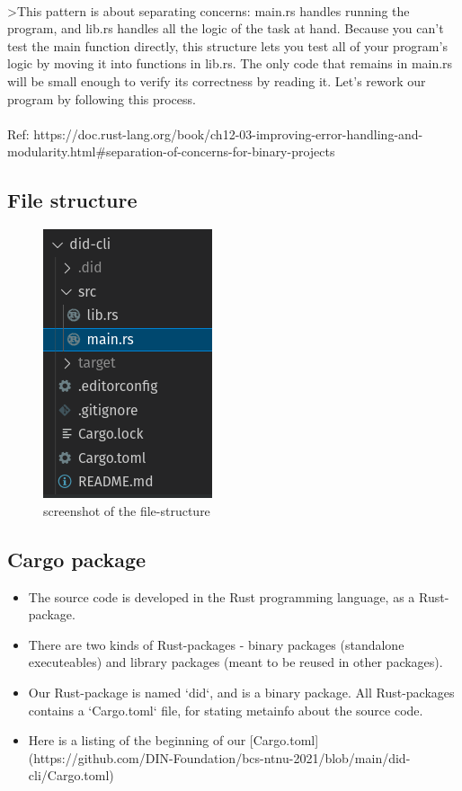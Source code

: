 \paragraph{}
>This pattern is about separating concerns: main.rs handles running the program, and lib.rs handles all the logic of the task at hand. Because you can’t test the main function directly, this structure lets you test all of your program’s logic by moving it into functions in lib.rs. The only code that remains in main.rs will be small enough to verify its correctness by reading it. Let’s rework our program by following this process.

\paragraph{}
Ref: https://doc.rust-lang.org/book/ch12-03-improving-error-handling-and-modularity.html#separation-of-concerns-for-binary-projects


\subsection{File structure}


    \begin{figure}[htbp]
      \centering
      \includegraphics[width=.3\textwidth]{figures/code-organization.png}
      \caption[]{screenshot of the file-structure}
    \end{figure}

\subsection{Cargo package}

\begin{itemize}
    \item The source code is developed in the Rust programming language, as a Rust-package.
    \item There are two kinds of Rust-packages - binary packages (standalone executeables) and library packages (meant to be reused in other packages).
    \item Our Rust-package is named `did`, and is a binary package.
     All Rust-packages contains a `Cargo.toml` file, for stating metainfo about the source code.
    \item Here is a listing of the beginning of our [Cargo.toml](https://github.com/DIN-Foundation/bcs-ntnu-2021/blob/main/did-cli/Cargo.toml)
\end{itemize}
    
